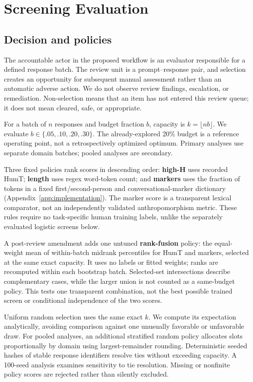 \documentclass[manuscript,screen,review,anonymous]{acmart}
\begin{document}
\section{Screening Evaluation}
\subsection{Decision and policies}
The accountable actor in the proposed workflow is an evaluator responsible for a defined response batch. The review unit is a prompt--response pair, and selection creates an opportunity for subsequent manual assessment rather than an automatic adverse action. We do not observe review findings, escalation, or remediation. Non-selection means that an item has not entered this review queue; it does not mean cleared, safe, or appropriate.

For a batch of $n$ responses and budget fraction $b$, capacity is $k=\lfloor nb\rfloor$. We evaluate $b\in\{.05,.10,.20,.30\}$. The already-explored 20\% budget is a reference operating point, not a retrospectively optimized optimum. Primary analyses use separate domain batches; pooled analyses are secondary.

Three fixed policies rank scores in descending order: \textbf{high-H} uses recorded HumT; \textbf{length} uses regex word-token count; and \textbf{markers} uses the fraction of tokens in a fixed first/second-person and conversational-marker dictionary (Appendix~\ref{app:implementation}). The marker score is a transparent lexical comparator, not an independently validated anthropomorphism metric. These rules require no task-specific human training labels, unlike the separately evaluated logistic screens below.

A post-review amendment adds one untuned \textbf{rank-fusion} policy: the equal-weight mean of within-batch midrank percentiles for HumT and markers, selected at the same exact capacity. It uses no labels or fitted weights; ranks are recomputed within each bootstrap batch. Selected-set intersections describe complementary cases, while the larger union is not counted as a same-budget policy. This tests one transparent combination, not the best possible trained screen or conditional independence of the two scores.

Uniform random selection uses the same exact $k$. We compute its expectation analytically, avoiding comparison against one unusually favorable or unfavorable draw. For pooled analyses, an additional stratified random policy allocates slots proportionally by domain using largest-remainder rounding. Deterministic seeded hashes of stable response identifiers resolve ties without exceeding capacity. A 100-seed analysis examines sensitivity to tie resolution. Missing or nonfinite policy scores are rejected rather than silently excluded.
\end{document}
